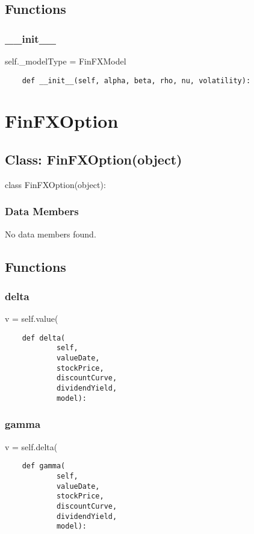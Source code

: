 \documentclass[twoside,11pt]{book}
\begin{document}
\subsection*{Functions}

\subsubsection*{{\bf \_\_init\_\_}}
self.\_modelType = FinFXModel 

\begin{lstlisting}
    def __init__(self, alpha, beta, rho, nu, volatility):
\end{lstlisting}

\newpage
\section{FinFXOption}

\subsection*{Class: FinFXOption(object)}
class FinFXOption(object): 

\subsubsection*{Data Members}
No data members found.

\subsection*{Functions}

\subsubsection*{{\bf delta}}
v = self.value( 

\begin{lstlisting}
    def delta(
            self,
            valueDate,
            stockPrice,
            discountCurve,
            dividendYield,
            model):
\end{lstlisting}

\subsubsection*{{\bf gamma}}
v = self.delta( 

\begin{lstlisting}
    def gamma(
            self,
            valueDate,
            stockPrice,
            discountCurve,
            dividendYield,
            model):
\end{lstlisting}
\end{document}
